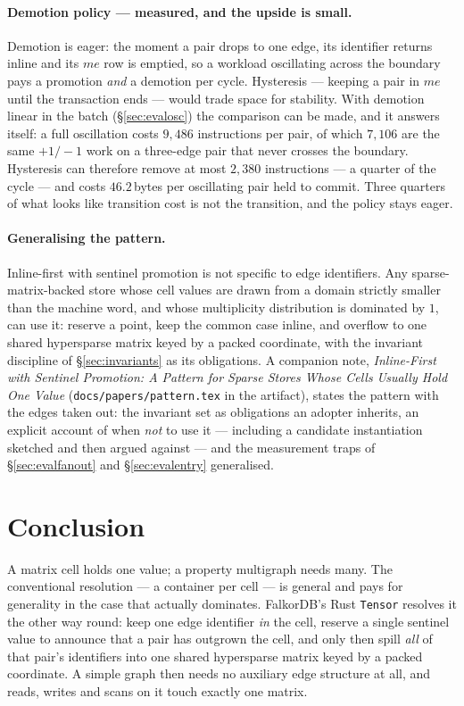 \documentclass[11pt,a4paper]{article}
\theoremstyle{plain}
\theoremstyle{definition}
\theoremstyle{remark}
\begin{document}
\paragraph{Demotion policy --- measured, and the upside is small.} Demotion is
eager: the moment a pair drops to one edge, its identifier returns inline and its
$me$ row is emptied, so a workload oscillating across the boundary pays a
promotion \emph{and} a demotion per cycle. Hysteresis --- keeping a pair in $me$
until the transaction ends --- would trade space for stability. With demotion
linear in the batch (\S\ref{sec:evalosc}) the comparison can be made, and it
answers itself: a full oscillation costs $9{,}486$ instructions per pair, of
which $7{,}106$ are the same $+1/-1$ work on a three-edge pair that never crosses
the boundary. Hysteresis can therefore remove at most $2{,}380$ instructions ---
a quarter of the cycle --- and costs $46.2$\,bytes per oscillating pair held to
commit. Three quarters of what looks like transition cost is not the transition,
and the policy stays eager.

\paragraph{Generalising the pattern.} Inline-first with sentinel promotion is
not specific to edge identifiers. Any sparse-matrix-backed store whose cell
values are drawn from a domain strictly smaller than the machine word, and
whose multiplicity distribution is dominated by $1$, can use it: reserve a
point, keep the common case inline, and overflow to one shared hypersparse
matrix keyed by a packed coordinate, with the invariant discipline of
\S\ref{sec:invariants} as its obligations. A companion note,
\emph{Inline-First with Sentinel Promotion: A Pattern for Sparse Stores Whose
Cells Usually Hold One Value} (\texttt{docs/papers/pattern.tex} in the
artifact), states the pattern with the edges taken out: the invariant set as
obligations an adopter inherits, an explicit account of when \emph{not} to use
it --- including a candidate instantiation sketched and then argued against ---
and the measurement traps of \S\ref{sec:evalfanout} and \S\ref{sec:evalentry}
generalised.

\section{Conclusion}

A matrix cell holds one value; a property multigraph needs many. The
conventional resolution --- a container per cell --- is general and pays for
generality in the case that actually dominates. FalkorDB's Rust
\texttt{Tensor} resolves it the other way round: keep one edge identifier
\emph{in} the cell, reserve a single sentinel value to announce that a pair
has outgrown the cell, and only then spill \emph{all} of that pair's
identifiers into one shared hypersparse matrix keyed by a packed coordinate.
A simple graph then needs no auxiliary edge structure at all, and reads,
writes and scans on it touch exactly one matrix.
\end{document}
